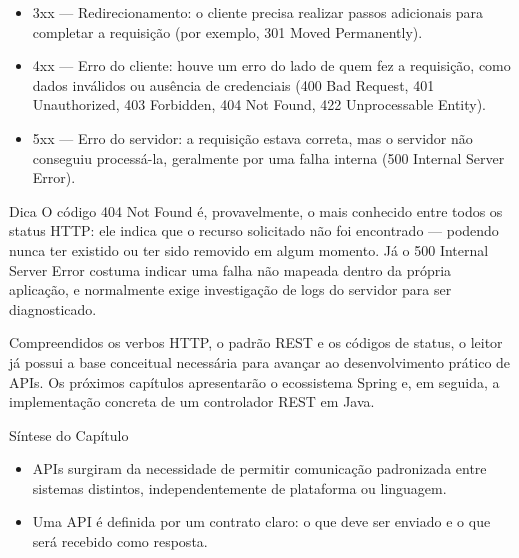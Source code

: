 \begin{itemize}
  \item 3xx — Redirecionamento: o cliente precisa realizar passos adicionais para completar a requisição (por exemplo, 301 Moved Permanently).
\end{itemize}

\begin{itemize}
  \item 4xx — Erro do cliente: houve um erro do lado de quem fez a requisição, como dados inválidos ou ausência de credenciais (400 Bad Request, 401 Unauthorized, 403 Forbidden, 404 Not Found, 422 Unprocessable Entity).
\end{itemize}

\begin{itemize}
  \item 5xx — Erro do servidor: a requisição estava correta, mas o servidor não conseguiu processá-la, geralmente por uma falha interna (500 Internal Server Error).
\end{itemize}

\begin{infobox}{Dica}
O código 404 Not Found é, provavelmente, o mais conhecido entre todos os status HTTP: ele indica que o recurso solicitado não foi encontrado — podendo nunca ter existido ou ter sido removido em algum momento. Já o 500 Internal Server Error costuma indicar uma falha não mapeada dentro da própria aplicação, e normalmente exige investigação de logs do servidor para ser diagnosticado.
\end{infobox}

Compreendidos os verbos HTTP, o padrão REST e os códigos de status, o leitor já possui a base conceitual necessária para avançar ao desenvolvimento prático de APIs. Os próximos capítulos apresentarão o ecossistema Spring e, em seguida, a implementação concreta de um controlador REST em Java.

Síntese do Capítulo

\begin{itemize}
  \item APIs surgiram da necessidade de permitir comunicação padronizada entre sistemas distintos, independentemente de plataforma ou linguagem.
\end{itemize}

\begin{itemize}
  \item Uma API é definida por um contrato claro: o que deve ser enviado e o que será recebido como resposta.
\end{itemize}

